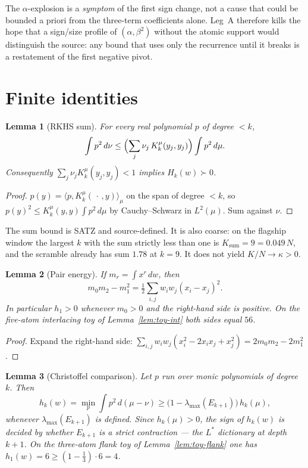\documentclass[11pt]{article}
\newtheorem{lemma}{Lemma}
\theoremstyle{remark}
\begin{document}
The $\alpha$-explosion is a \emph{symptom} of the first sign
change, not a cause that could be bounded a priori from the
three-term coefficients alone.  Leg~A therefore kills the hope
that a sign/size profile of $(\alpha,\beta^2)$ without the
atomic support would distinguish the source: any bound that
uses only the recurrence until it breaks is a restatement of
the first negative pivot.

\section{Finite identities}\label{sec:id}

\begin{lemma}[RKHS sum]\label{lem:rkhs}
For every real polynomial $p$ of degree $<k$,
\[
\int p^2\,d\nu
\le
\Bigl(\sum_j \nu_j\,K_k^\mu(y_j,y_j)\Bigr)
\int p^2\,d\mu.
\]
Consequently $\sum_j\nu_j K_k^\mu(y_j,y_j)<1$ implies
$H_k(w)\succ 0$.
\end{lemma}

\begin{proof}
$p(y)=\langle p,K_k^\mu(\,\cdot\,,y)\rangle_\mu$ on the span of
degree $<k$, so $p(y)^2\le K_k^\mu(y,y)\int p^2\,d\mu$ by Cauchy--Schwarz
in $L^2(\mu)$.  Sum against $\nu$.
\end{proof}

The sum bound is SATZ and source-defined.  It is also coarse:
on the flagship window the largest $k$ with the sum strictly
less than one is $K_{\mathrm{sum}}=9=0.049\,N$, and the scramble
already has sum $1.78$ at $k=9$.  It does not yield
$K/N\to\kappa>0$.

\begin{lemma}[Pair energy]\label{lem:energy}
If $m_r=\int x^r\,dw$, then
\[
m_0 m_2-m_1^2
=\tfrac12\sum_{i,j}w_i w_j(x_i-x_j)^2.
\]
In particular $h_1>0$ whenever $m_0>0$ and the right-hand side is
positive.  On the five-atom interlacing toy of
Lemma~\ref{lem:toy-int} both sides equal $56$.
\end{lemma}

\begin{proof}
Expand the right-hand side:
$\sum_{i,j}w_i w_j(x_i^2-2x_i x_j+x_j^2)
=2m_0 m_2-2m_1^2$.
\end{proof}

\begin{lemma}[Christoffel comparison]\label{lem:christoffel}
Let $p$ run over monic polynomials of degree $k$.  Then
\[
h_k(w)
=\min_p\int p^2\,d(\mu-\nu)
\ge
\bigl(1-\lambda_{\max}(E_{k+1})\bigr)\,h_k(\mu),
\]
whenever $\lambda_{\max}(E_{k+1})$ is defined.  Since $h_k(\mu)>0$,
the sign of $h_k(w)$ is decided by whether $E_{k+1}$ is a strict
contraction --- the $L^*$ dictionary at depth $k+1$.  On the
three-atom flank toy of Lemma~\ref{lem:toy-flank} one has
$h_1(w)=6\ge(1-\tfrac13)\cdot 6=4$.
\end{lemma}
\end{document}
